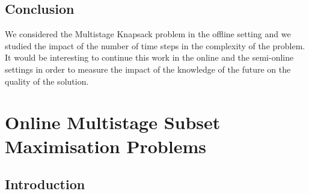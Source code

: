 \documentclass[a4paper]{book}
\begin{document}
\section{Conclusion}
We considered the {\sc Multistage Knapsack} problem in the offline setting and we studied the impact of the number of time steps in the complexity of the problem. It would be interesting to continue this work in the online and the semi-online settings in order to measure the impact of the knowledge of the future on the quality of the solution.








\label{}



\chapter{Online Multistage Subset Maximisation Problems} \label{chap:onlmultista}

\section{Introduction}
\end{document}
